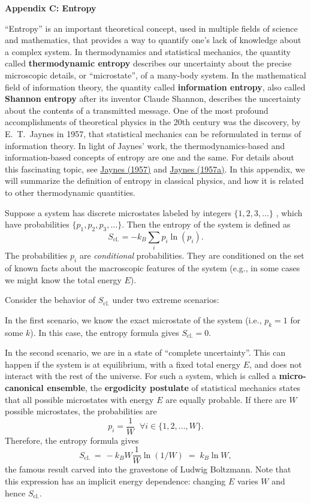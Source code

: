 \documentclass[pra,12pt]{revtex4}
\begin{document}
\begin{center}
{\large \textbf{Appendix C: Entropy}}
\end{center}

``Entropy'' is an important theoretical concept, used in multiple
fields of science and mathematics, that provides a way to quantify
one's lack of knowledge about a complex system.  In thermodynamics and
statistical mechanics, the quantity called \textbf{thermodynamic
  entropy} describes our uncertainty about the precise microscopic
details, or ``microstate'', of a many-body system.  In the
mathematical field of information theory, the quantity called
\textbf{information entropy}, also called \textbf{Shannon entropy}
after its inventor Claude Shannon, describes the uncertainty about the
contents of a transmitted message.  One of the most profound
accomplishments of theoretical physics in the 20th century was the
discovery, by E.~T.~Jaynes in 1957, that statistical mechanics can be
reformulated in terms of information theory.  In light of Jaynes'
work, the thermodynamics-based and information-based concepts of
entropy are one and the same.  For details about this fascinating
topic, see \hyperref[cite:jaynes]{Jaynes (1957)} and
\hyperref[cite:jaynes2]{Jaynes (1957a)}.  In this appendix, we will
summarize the definition of entropy in classical physics, and how it
is related to other thermodynamic quantities.

Suppose a system has discrete microstates labeled by integers
$\{1,2,3,\dots\}$ , which have probabilities $\{p_1, p_2, p_3,
\dots\}$.  Then the entropy of the system is defined as
$$S_{\mathrm{cl.}} = - k_B \sum_{i} p_i \ln(p_i).$$
The probabilities $p_i$ are \textit{conditional} probabilities.  They
are conditioned on the set of known facts about the macroscopic
features of the system (e.g., in some cases we might know the total
energy $E$).

Consider the behavior of $S_{\mathrm{cl.}}$ under two extreme
scenarios:

In the first scenario, we know the exact microstate of the system
(i.e., $p_k = 1$ for some $k$).  In this case, the entropy formula
gives $S_{\mathrm{cl.}} = 0$.

In the second scenario, we are in a state of ``complete uncertainty''.
This can happen if the system is at equilibrium, with a fixed total
energy $E$, and does not interact with the rest of the universe.  For
such a system, which is called a \textbf{micro-canonical ensemble},
the \textbf{ergodicity postulate} of statistical mechanics states that
all possible microstates with energy $E$ are equally probable.  If
there are $W$ possible microstates, the probabilities are
$$p_i = \frac{1}{W} \;\;\forall i \in \{1,2,\dots,W\}.$$
Therefore, the entropy formula gives
$$S_{\mathrm{cl.}} \,=\, -k_B W \frac{1}{W} \ln(1/W) \;=\; k_B \ln W,$$
the famous result carved into the gravestone of Ludwig Boltzmann.
Note that this expression has an implicit energy dependence: changing
$E$ varies $W$ and hence $S_{\mathrm{cl.}}$.
\end{document}
